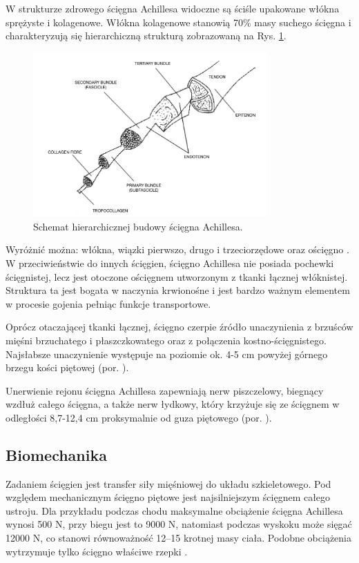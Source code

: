 W strukturze zdrowego ścięgna Achillesa widoczne są ściśle upakowane włókna sprężyste i kolagenowe. Włókna kolagenowe stanowią 70\% masy suchego ścięgna i charakteryzują się hierarchiczną strukturą zobrazowaną na Rys. \ref{Achilles-histology}.  
\begin{figure}[h!]
	\centering
	\includegraphics[width=0.8\textwidth]{figures/Achilles_hist.png}
	\caption{Schemat hierarchicznej budowy ścięgna Achillesa.}
	\label{Achilles-histology}
\end{figure}

Wyróżnić można: włókna, wiązki pierwszo, drugo i trzeciorzędowe oraz ościęgno \cite{Sharma2006}. W przeciwieństwie do innych ścięgien, ścięgno Achillesa nie posiada pochewki ścięgnistej, lecz jest otoczone ościęgnem utworzonym z tkanki łącznej włóknistej. Struktura ta jest bogata w naczynia krwionośne i jest bardzo ważnym elementem w procesie gojenia pełniąc funkcje transportowe. 

Oprócz otaczającej tkanki łącznej, ścięgno czerpie źródło unaczynienia z brzuśców mięśni brzuchatego i płaszczkowatego oraz z połączenia kostno-ścięgnistego. Najsłabsze unaczynienie występuje na poziomie ok. 4-5 cm powyżej górnego brzegu kości piętowej (por. \cite{bochenek2016anatomia}).

Unerwienie rejonu ścięgna Achillesa zapewniają nerw piszczelowy, biegnący wzdłuż całego ścięgna, a także nerw łydkowy, który krzyżuje się ze ścięgnem w odległości 8,7-12,4 cm proksymalnie od guza piętowego (por. \cite{bochenek2016anatomia}). 

\subsection{Biomechanika}
\label{Biomechanika}
Zadaniem ścięgien jest transfer siły mięśniowej do układu szkieletowego. Pod względem mechanicznym ścięgno piętowe jest najsilniejszym ścięgnem całego ustroju. Dla przykładu podczas chodu maksymalne obciążenie ścięgna Achillesa wynosi 500 N, przy biegu jest to 9000 N, natomiast podczas wyskoku może sięgać 12000 N, co stanowi równoważność 12--15 krotnej masy ciała. Podobne obciążenia wytrzymuje tylko ścięgno właściwe rzepki \cite{Etiologia}.

